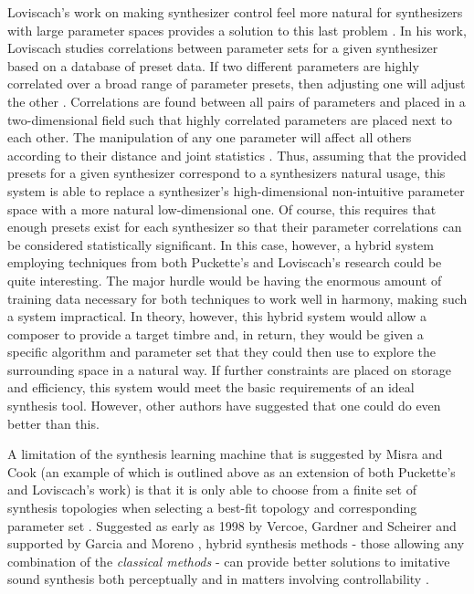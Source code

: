 \documentclass[12pt]{report} 	%
\numberwithin{figure}{chapter}
\numberwithin{table}{chapter}
\numberwithin{equation}{chapter}
\begin{document}
\begin{flushleft}
Loviscach's work on making synthesizer control feel more natural for synthesizers with large parameter spaces provides a solution to this last problem \cite{Loviscach:2009mi}. In his work, Loviscach studies correlations between parameter sets for a given synthesizer based on a database of preset data. If two different parameters are highly correlated over a broad range of parameter presets, then adjusting one will adjust the other \cite[p. 1]{Loviscach:2009mi}. Correlations are found between all pairs of parameters and placed in a two-dimensional field such that highly correlated parameters are placed next to each other. The manipulation of any one parameter will affect all others according to their distance and joint statistics \cite[p. 1]{Loviscach:2009mi}. Thus, assuming that the provided presets for a given synthesizer correspond to a synthesizers natural usage, this system is able to replace a synthesizer's high-dimensional non-intuitive parameter space with a more natural low-dimensional one. Of course, this requires that enough presets exist for each synthesizer so that their parameter correlations can be considered statistically significant. In this case, however, a hybrid system employing techniques from both Puckette's and Loviscach's research could be quite interesting. The major hurdle would be having the enormous amount of training data necessary for both techniques to work well in harmony, making such a system impractical. In theory, however, this hybrid system would allow a composer to provide a target timbre and, in return, they would be given a specific algorithm and parameter set that they could then use to explore the surrounding space in a natural way. If further constraints are placed on storage and efficiency, this system would meet the basic requirements of an ideal synthesis tool. However, other authors have suggested that one could do even better than this.

A limitation of the synthesis learning machine that is suggested by Misra and Cook (an example of which is outlined above as an extension of both Puckette's and Loviscach's work) is that it is only able to choose from a finite set of synthesis topologies when selecting a best-fit topology and corresponding parameter set \cite[p. 1]{Misra:2009km}. Suggested as early as 1998 by Vercoe, Gardner and Scheirer and supported by Garcia \cite[p. 2]{Garcia:2000th} and Moreno \cite[p. 1]{Moreno:2005bs}, hybrid synthesis methods - those allowing any combination of the \textit{classical methods} - can provide better solutions to imitative sound synthesis both perceptually and in matters involving controllability \cite[p. 9]{Vercoe:1998hh}.


\end{flushleft}
\end{document}
